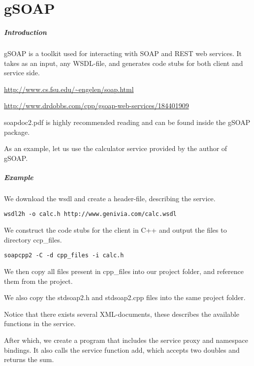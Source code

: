\chapter{gSOAP}
\paragraph{Introduction}
gSOAP is a toolkit used for interacting with SOAP and REST web services. It takes as an input, any WSDL-file, and generates code stubs for both client and service side.

\url{http://www.cs.fsu.edu/~engelen/soap.html}

\url{http://www.drdobbs.com/cpp/gsoap-web-services/184401909}

soapdoc2.pdf is highly recommended reading and can be found inside the gSOAP package.

As an example, let us use the calculator service provided by the author of gSOAP.
\paragraph{Example}
We download the wsdl and create a header-file, describing the service.
\begin{lstlisting}[style=BashInputStyle]
    wsdl2h -o calc.h http://www.genivia.com/calc.wsdl
\end{lstlisting}

We construct the code stubs for the client in C++ and output the files to directory ccp\_files.
\begin{lstlisting}[style=BashInputStyle]
    soapcpp2 -C -d cpp_files -i calc.h
\end{lstlisting}

We then copy all files present in cpp\_files into our project folder, and reference them from the project.

We also copy the stdsoap2.h and stdsoap2.cpp files into the same project folder.

Notice that there exists several XML-documents, these describes the available functions in the service.

After which, we create a program that includes the service proxy and namespace bindings. It also calls the service function add, which accepts two doubles and returns the sum.

